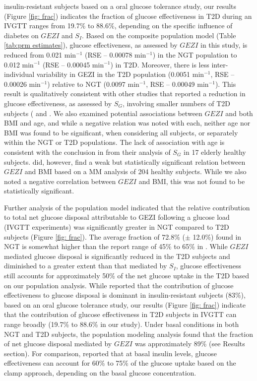 \documentclass[utf8]{frontiersSCNS} %
\begin{document}
insulin-resistant subjects based on a oral glucose tolerance study, our results (Figure \ref{fig: frac}) indicates the fraction of glucose effectiveness in T2D during an IVGTT ranges from 19.7\% to 88.6\%, depending on the specific influence of diabetes on $GEZI$ and $S_I$.  
Based on the composite population model (Table \ref{tab:prm estimates}), glucose effectiveness, as assessed by $GEZI$ in this study, is reduced from 0.021 min$^{-1}$ (RSE – 0.00078 min$^{-1}$) in the NGT population to 0.012 min$^{-1}$ (RSE – 0.00045 min$^{-1}$) in T2D. Moreover, there is less inter-individual variability in GEZI in the T2D population (0.0051 min$^{-1}$, RSE – 0.00026 min$^{-1}$) relative to NGT (0.0097 min$^{-1}$, RSE – 0.00049 min$^{-1}$). This result is qualitatively consistent with other studies that reported a reduction in glucose effectiveness, as assessed by $S_G$, involving smaller numbers of T2D subjects (\citet{welch_1990} and \citet{ataru_1992}. We also examined potential associations between $GEZI$ and both BMI and age, and while a negative relation was noted with each, neither age nor BMI was found to be significant, when considering all subjects, or separately within the NGT or T2D populations. The lack of association with age is consistent with the conclusion in \citet{pacini_1998} from their analysis of $S_G$ in 17 elderly healthy subjects. \citet{Morettini_2019} did, however, find a weak but statistically significant relation between $GEZI$ and BMI based on a MM analysis of 204 healthy subjects. While we also noted a negative correlation between $GEZI$ and BMI, this was not found to be statistically significant.

Further analysis of the population model indicated that the relative contribution to total net glucose disposal attributable to GEZI following a glucose load (IVGTT experiments) was significantly greater in NGT compared to T2D subjects (Figure \ref{fig: frac}). The average fraction of 72.8\% ($\pm$ 12.0\%) found in NGT is somewhat higher than the report range of 45\% to 65\% in \citet{Alford_2018}. While $GEZI$ mediated glucose disposal is significantly reduced in the T2D subjects and diminished to a greater extent than that mediated by $S_I$, glucose effectiveness still accounts for approximately 50\% of the net glucose uptake in the T2D based on our population analysis. While \citet{Best1996} reported that the contribution of glucose effectiveness to glucose disposal is dominant in insulin-resistant subjects (83\%), based on an oral glucose tolerance study, our results (Figure \ref{fig: frac}) indicate that the contribution of glucose effectiveness in T2D subjects in IVGTT can range broadly (19.7\% to 88.6\% in our study). Under basal conditions in both NGT and T2D subjects, the population modeling analysis found that the fraction of net glucose disposal mediated by $GEZI$ was approximately 89\% (see Results section). For comparison, \citet{Best1996} reported that at basal insulin levels, glucose effectiveness can account for 60\% to 75\% of the glucose uptake based on the clamp approach, depending on the basal glucose concentration. 
\end{document}
